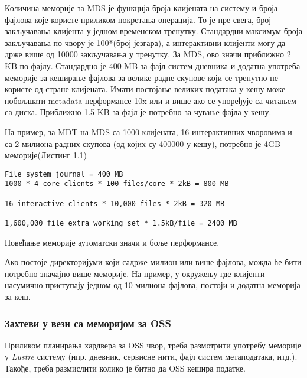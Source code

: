 Количина меморије за MDS је функција броја клијената  на систему и броја фајлова које користе приликом покретања операција. То је пре свега, број закључавања клијента у једном временском тренутку. Стандардни максимум броја закључавања по чвору је 100*(број језгара), а интерактивни клијенти могу да држе више од 10000 закључавања у тренутку. За MDS, ово значи приближно 2 KB по фајлу.
Стандардно је 400 MB за  фајл систем дневника и додатна употреба меморије за кеширање фајлова за велике радне скупове који се тренутно не користе од стране клијената. Имати постојање великих података у кешу  може побољшати metadata перформансе 10x или и више ако се упоређује са читањем са диска. Приближно 1.5 KB за фајл је потребно за чување фајла у кешу. 

На пример, за MDT на MDS са  1000 клијената, 16 интерактивних  чворовима и са 2  милиона радних скупова (од којих су 400000 у кешу), потребно је 4GB меморије(Листинг 1.1)

\begin{lstlisting}[style=nonumbers,frame=single, caption=Количина меморије за MDT]
File system journal = 400 MB
1000 * 4-core clients * 100 files/core * 2kB = 800 MB

16 interactive clients * 10,000 files * 2kB = 320 MB

1,600,000 file extra working set * 1.5kB/file = 2400 MB
\end{lstlisting}

Повећање меморије аутоматски значи и боље перформансе.

Ако постоје директоријуми који садрже милион или више фајлова, можда ће бити потребно значајно  више меморије. На пример, у окружењу где клијенти насумично приступају једном од 10 милиона фајлова, постоји и додатна меморија за кеш.

\subsubsection{Захтеви у вези са меморијом за OSS}

 
Приликом планирања хардвера за OSS чвор, треба размотрити употребу меморије у   \textit{Lustre} систему (нпр. дневник, сервисне нити, фајл систем метаподатака, итд.). Такође, треба размислити колико је битно да OSS  кешира податке.

